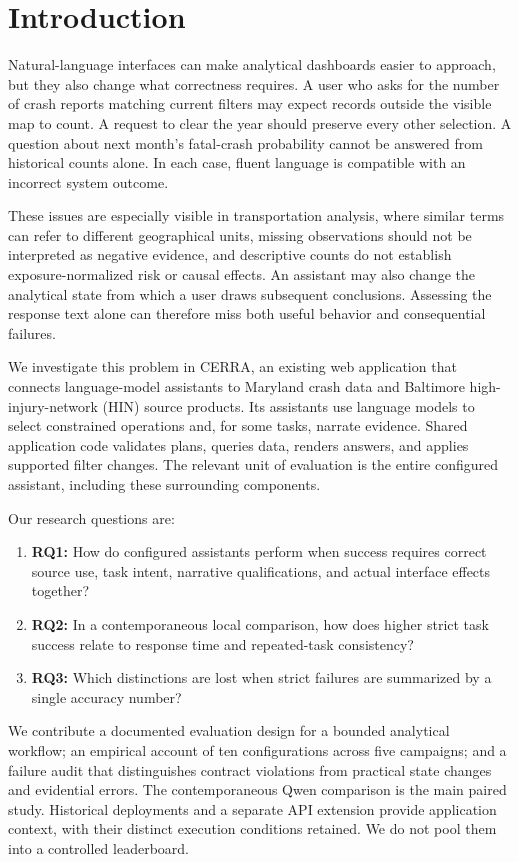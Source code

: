 \documentclass[10pt,twocolumn,letterpaper]{article}
\begin{document}
\section{Introduction}
Natural-language interfaces can make analytical dashboards easier to approach, but they also change what correctness requires. A user who asks for the number of crash reports matching current filters may expect records outside the visible map to count. A request to clear the year should preserve every other selection. A question about next month's fatal-crash probability cannot be answered from historical counts alone. In each case, fluent language is compatible with an incorrect system outcome.

These issues are especially visible in transportation analysis, where similar terms can refer to different geographical units, missing observations should not be interpreted as negative evidence, and descriptive counts do not establish exposure-normalized risk or causal effects. An assistant may also change the analytical state from which a user draws subsequent conclusions. Assessing the response text alone can therefore miss both useful behavior and consequential failures.

We investigate this problem in CERRA, an existing web application that connects language-model assistants to Maryland crash data and Baltimore high-injury-network (HIN) source products. Its assistants use language models to select constrained operations and, for some tasks, narrate evidence. Shared application code validates plans, queries data, renders answers, and applies supported filter changes. The relevant unit of evaluation is the entire configured assistant, including these surrounding components.

Our research questions are:
\begin{enumerate}
\item \textbf{RQ1:} How do configured assistants perform when success requires correct source use, task intent, narrative qualifications, and actual interface effects together?
\item \textbf{RQ2:} In a contemporaneous local comparison, how does higher strict task success relate to response time and repeated-task consistency?
\item \textbf{RQ3:} Which distinctions are lost when strict failures are summarized by a single accuracy number?
\end{enumerate}

We contribute a documented evaluation design for a bounded analytical workflow; an empirical account of ten configurations across five campaigns; and a failure audit that distinguishes contract violations from practical state changes and evidential errors. The contemporaneous Qwen comparison is the main paired study. Historical deployments and a separate API extension provide application context, with their distinct execution conditions retained. We do not pool them into a controlled leaderboard.
\end{document}
